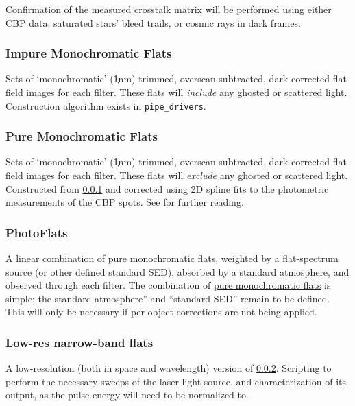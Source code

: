 Confirmation of the measured crosstalk matrix will be performed using either CBP data, saturated stars' bleed trails, or cosmic rays in dark frames.



\subsubsection{Impure Monochromatic Flats}\label{sec:CPP:output:monoFlat}
Sets of `monochromatic' (\c 1nm) trimmed, overscan-subtracted, dark-corrected flat-field images for each filter. These flats will \emph{include} any ghosted or scattered light.
\alg Construction algorithm exists in \texttt{pipe\_drivers}.


\subsubsection{Pure Monochromatic Flats}\label{sec:CPP:output:monoPhotoFlat}
Sets of `monochromatic' (\c 1nm) trimmed, overscan-subtracted, dark-corrected flat-field images for each filter. These flats will \emph{exclude} any ghosted or scattered light.
\alg Constructed from \secsymbol\ref{sec:CPP:output:monoFlat} and corrected using 2D spline fits to the photometric measurements of the CBP spots. See  for further reading.


\subsubsection{PhotoFlats}\label{sec:CPP:output:standardPhotoFlat}
A linear combination of \hyperref[sec:CPP:output:monoPhotoFlat]{pure monochromatic flats}, weighted by a flat-spectrum source (or other defined standard SED), absorbed by a standard atmosphere, and observed through each filter.
\alg The combination of \hyperref[sec:CPP:output:monoPhotoFlat]{pure monochromatic flats} is simple; the standard atmosphere'' and ``standard SED'' remain to be defined. This will only be necessary if per-object corrections are not being applied.


\subsubsection{Low-res narrow-band flats}\label{sec:CPP:output:monoPhotoFlatLowRes}
A low-resolution (both in space and wavelength) version of \secsymbol\ref{sec:CPP:output:monoPhotoFlat}.
\alg Scripting to perform the necessary sweeps of the laser light source, and characterization of its output, as the pulse energy will need to be normalized to.	


